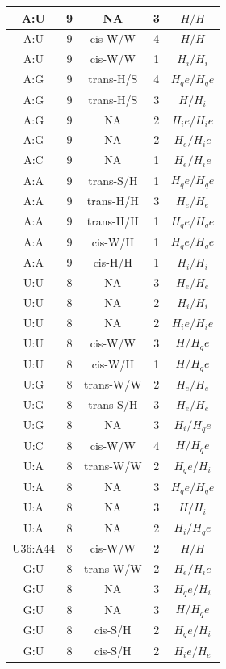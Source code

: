 \begin{center}
\begin{longtable}{c|c|c|c|c}
A:U & 9 & NA & 3 & $H/H$ \\  \hline
A:U & 9 & cis-W/W & 4 & $H/H$ \\  \hline
A:U & 9 & cis-W/W & 1 & $H_i/H_i$ \\  \hline
A:G & 9 & trans-H/S & 4 & $H_qe/H_qe$ \\  \hline
A:G & 9 & trans-H/S & 3 & $H/H_i$ \\  \hline
A:G & 9 & NA & 2 & $H_ie/H_ie$ \\  \hline
A:G & 9 & NA & 2 & $H_e/H_ie$ \\  \hline
A:C & 9 & NA & 1 & $H_e/H_ie$ \\  \hline
A:A & 9 & trans-S/H & 1 & $H_qe/H_qe$ \\  \hline
A:A & 9 & trans-H/H & 3 & $H_e/H_e$ \\  \hline
A:A & 9 & trans-H/H & 1 & $H_qe/H_qe$ \\  \hline
A:A & 9 & cis-W/H & 1 & $H_qe/H_qe$ \\  \hline
A:A & 9 & cis-H/H & 1 & $H_i/H_i$ \\  \hline
U:U & 8 & NA & 3 & $H_e/H_e$ \\  \hline
U:U & 8 & NA & 2 & $H_i/H_i$ \\  \hline
U:U & 8 & NA & 2 & $H_ie/H_ie$ \\  \hline
U:U & 8 & cis-W/W & 3 & $H/H_qe$ \\  \hline
U:U & 8 & cis-W/H & 1 & $H/H_qe$ \\  \hline
U:G & 8 & trans-W/W & 2 & $H_e/H_e$ \\  \hline
U:G & 8 & trans-S/H & 3 & $H_e/H_e$ \\  \hline
U:G & 8 & NA & 3 & $H_i/H_qe$ \\  \hline
U:C & 8 & cis-W/W & 4 & $H/H_qe$ \\  \hline
U:A & 8 & trans-W/W & 2 & $H_qe/H_i$ \\  \hline
U:A & 8 & NA & 3 & $H_qe/H_qe$ \\  \hline
U:A & 8 & NA & 3 & $H/H_i$ \\  \hline
U:A & 8 & NA & 2 & $H_i/H_qe$ \\  \hline
U36:A44 & 8 & cis-W/W & 2 & $H/H$ \\  \hline
G:U & 8 & trans-W/W & 2 & $H_e/H_ie$ \\  \hline
G:U & 8 & NA & 3 & $H_qe/H_i$ \\  \hline
G:U & 8 & NA & 3 & $H/H_qe$ \\  \hline
G:U & 8 & cis-S/H & 2 & $H_qe/H_i$ \\  \hline
G:U & 8 & cis-S/H & 2 & $H_ie/H_e$ \\  \hline

\end{longtable}
\end{center}
